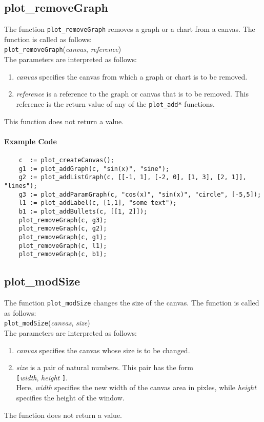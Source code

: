 \subsection{plot\_removeGraph}
The function \texttt{plot\_removeGraph} removes a graph or a chart from a canvas.
The function is called as follows:
\\[0.2cm]
\hspace*{1.3cm}
\texttt{plot\_removeGraph}(\textsl{canvas}, \textsl{reference})
\\[0.2cm]
The parameters are interpreted as follows:
\begin{enumerate}
\item \textsl{canvas} specifies the canvas from which a graph or chart is to be removed.
\item \textsl{reference} is a reference to the graph or canvas that is to be removed.
      This reference is the return value of any of the \texttt{plot\_add*} functions.
\end{enumerate}
This function does not return a value.

\paragraph{Example Code}
\begin{verbatim}
    c  := plot_createCanvas();
    g1 := plot_addGraph(c, "sin(x)", "sine");
    g2 := plot_addListGraph(c, [[-1, 1], [-2, 0], [1, 3], [2, 1]], "lines");
    g3 := plot_addParamGraph(c, "cos(x)", "sin(x)", "circle", [-5,5]);
    l1 := plot_addLabel(c, [1,1], "some text");
    b1 := plot_addBullets(c, [[1, 2]]);
    plot_removeGraph(c, g3);
    plot_removeGraph(c, g2);
    plot_removeGraph(c, g1);
    plot_removeGraph(c, l1);
    plot_removeGraph(c, b1);
\end{verbatim}



\subsection{plot\_modSize}
The function \texttt{plot\_modSize} changes the size of the canvas.  The function is called as follows:
\\[0.2cm]
\hspace*{1.3cm}
\texttt{plot\_modSize}(\textsl{canvas}, \textsl{size})
\\[0.2cm]
The parameters are interpreted as follows:
\begin{enumerate}
\item \textsl{canvas} specifies the canvas whose size is to be changed.
\item \textsl{size} is a pair of natural numbers.  This pair has the form
      \\[0.2cm]
      \hspace*{1.3cm}
      \texttt{[}\textsl{width}, \textsl{height} \texttt{]}.
      \\[0.2cm]
      Here, \textsl{width} specifies the new width of the canvas area in pixles, while
      \textsl{height} specifies the height of the window.
\end{enumerate}
The function does not return a value.

